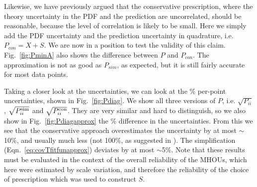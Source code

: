 Likewise, we have previously argued that the conservative prescription, where the theory uncertainty in the PDF and the prediction are uncorrelated, should be reasonable, because the level of correlation is likely to be small. Here we simply add the PDF uncertainty and the prediction uncertainty in quadrature, i.e. $P_{con} = X + S$. We are now in a position to test the validity of this claim. Fig.~\ref{fig:PminA} also shows the difference between $P$ and $P_{con}$. The approximation is not as good as $P_{sim}$, as expected, but it is still fairly accurate for most data points.

Taking a closer look at the uncertainties, we can look at the \% per-point uncertainties, shown in Fig.~\ref{fig:Pdiag}. We show all three versions of $P$, i.e. $\sqrt{P_{ii}}$, $\sqrt{P^{\rm sim}_{ii}}$ and $\sqrt{P^{\rm con}_{ii}}$. They are very similar and hard to distinguish, so we also show in 
Fig.~\ref{fig:Pdiagapprox} the \% difference in the uncertainties. From this we see that the conservative approach overestimates the uncertainty by at most $\sim$10\%, and usually much less (not 100\%, as suggested in \cite{Harland-Lang:2018bxd}). The simplification (Eqn.~\ref{eq:covTfitfunapprox}) deviates by at most $\sim$5\%. Note that these results must be evaluated in the context of the overall reliability of the MHOUs, which here were estimated by scale variation, and therefore the reliability of the choice of prescription which was used to construct $S$.

